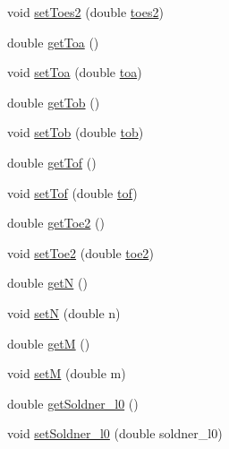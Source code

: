 \begin{DoxyCompactItemize}
void \hyperlink{classparams_1_1_ellipsoid_parms_aeeff1d0b99befdcc75383e3e9f475c58}{set\+Toes2} (double \hyperlink{classparams_1_1_ellipsoid_parms_a83a125728bc8d0f2d1935148ab97867d}{toes2})
\item 
double \hyperlink{classparams_1_1_ellipsoid_parms_ab9fb994a17b8b561d22be1de0b31f287}{get\+Toa} ()
\item 
void \hyperlink{classparams_1_1_ellipsoid_parms_afa3004dc536f9098e902be0dfe5c1a5b}{set\+Toa} (double \hyperlink{classparams_1_1_ellipsoid_parms_a6778e1b5d14507d1485a5e49a0935b8a}{toa})
\item 
double \hyperlink{classparams_1_1_ellipsoid_parms_ade69e57694ce4b388c6c75078875aee8}{get\+Tob} ()
\item 
void \hyperlink{classparams_1_1_ellipsoid_parms_a0f7664b1d2c2c20aec2b059e62cbe00f}{set\+Tob} (double \hyperlink{classparams_1_1_ellipsoid_parms_a440e25ee5cdf6444267c3f4dec8d5c4d}{tob})
\item 
double \hyperlink{classparams_1_1_ellipsoid_parms_a60fccf6eb2260e97082bb6789204f141}{get\+Tof} ()
\item 
void \hyperlink{classparams_1_1_ellipsoid_parms_a4dfc1bf7517139c222bbc4f5704eeeb1}{set\+Tof} (double \hyperlink{classparams_1_1_ellipsoid_parms_a97a668f9510e875e9542e7ec9d66b2ed}{tof})
\item 
double \hyperlink{classparams_1_1_ellipsoid_parms_ad150fd728cb5c16bba1716b5c17547ba}{get\+Toe2} ()
\item 
void \hyperlink{classparams_1_1_ellipsoid_parms_ac2a0d6cf273845316fd87f9a2cc47ff9}{set\+Toe2} (double \hyperlink{classparams_1_1_ellipsoid_parms_a185fd33e0e636da454abd7d6526d19d6}{toe2})
\item 
double \hyperlink{classparams_1_1_ellipsoid_parms_abb15b257c76e9880ed28c854a4731c0d}{getN} ()
\item 
void \hyperlink{classparams_1_1_ellipsoid_parms_a498387541756991907783083c45a457c}{setN} (double n)
\item 
double \hyperlink{classparams_1_1_ellipsoid_parms_aceac84961ab929328c39afc3357519c7}{getM} ()
\item 
void \hyperlink{classparams_1_1_ellipsoid_parms_ad33bd8b9852b20794f1c5b5cd024e51c}{setM} (double m)
\item 
double \hyperlink{classparams_1_1_ellipsoid_parms_afe6b1d0500228058310947eedeee20b7}{get\+Soldner\+\_\+l0} ()
\item 
void \hyperlink{classparams_1_1_ellipsoid_parms_a44b6361a151c89c4eb9425a9a19e6766}{set\+Soldner\+\_\+l0} (double soldner\+\_\+l0)

\end{DoxyCompactItemize}
